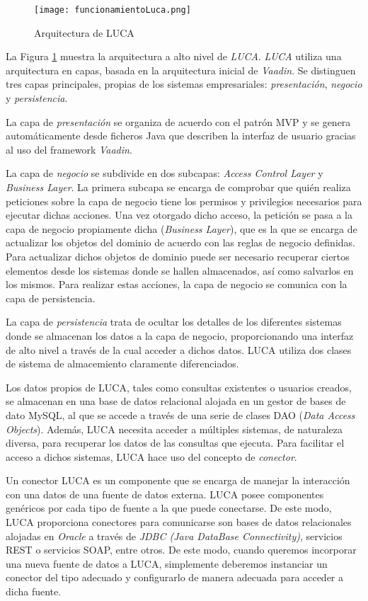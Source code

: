 \begin{figure}[H]
	\centering
	\texttt{[image: funcionamientoLuca.png]}
	\caption{Arquitectura de LUCA}
    \label{fig:funcionamientoLuca}
\end{figure}

La Figura \ref{fig:funcionamientoLuca} muestra la arquitectura a alto nivel de \emph{LUCA}. \emph{LUCA} utiliza una arquitectura en capas, basada en la arquitectura inicial de \emph{Vaadin}. Se distinguen tres capas principales, propias de los sistemas empresariales: \emph{presentación}, \emph{negocio} y \emph{persistencia}.

La capa de \emph{presentación} se organiza de acuerdo con el patrón MVP y se genera automáticamente desde ficheros Java que describen la interfaz de usuario gracias al uso del framework \emph{Vaadin}.

La capa de \emph{negocio} se subdivide en dos subcapas: \emph{Access Control Layer} y \emph{Business Layer}. La primera subcapa se encarga de comprobar que quién realiza peticiones sobre la capa de negocio tiene los permisos y privilegios necesarios para ejecutar dichas acciones. Una vez otorgado dicho acceso, la petición se pasa a la capa de negocio propiamente dicha (\emph{Business Layer}), que es la que se encarga de actualizar los objetos del dominio de acuerdo con las reglas de negocio definidas. Para actualizar dichos objetos de dominio puede ser necesario recuperar ciertos elementos desde los sistemas donde se hallen almacenados, así como salvarlos en los mismos. Para realizar estas acciones, la capa de negocio se comunica con la capa de persistencia. 

La capa de \emph{persistencia} trata de ocultar los detalles de los diferentes sistemas donde se almacenan los datos a la capa de negocio, proporcionando una interfaz de alto nivel a través de la cual acceder a dichos datos. LUCA utiliza dos clases de sistema de almacemiento claramente diferenciados. 

Los datos propios de LUCA, tales como consultas existentes o usuarios creados, se almacenan en una base de datos relacional alojada en un gestor de bases de dato MySQL, al que se accede a través de una serie de clases DAO (\emph{Data Access Objects}). Además, LUCA necesita acceder a múltiples sistemas, de naturaleza diversa, para recuperar los datos de las consultas que ejecuta. Para facilitar el acceso a dichos sistemas, LUCA hace uso del concepto de \emph{conector}.

Un conector LUCA es un componente que se encarga de manejar la interacción con una datos de una fuente de datos externa. LUCA posee componentes genéricos por cada tipo de fuente a la que puede conectarse. De este modo, LUCA proporciona conectores para comunicarse son bases de datos relacionales alojadas en \emph{Oracle} a través de \emph{JDBC (Java DataBase Connectivity)}, servicios REST o servicios SOAP, entre otros. De este modo, cuando queremos incorporar una nueva fuente de datos a LUCA, simplemente deberemos instanciar un conector del tipo adecuado y configurarlo de manera adecuada para acceder a dicha fuente.







